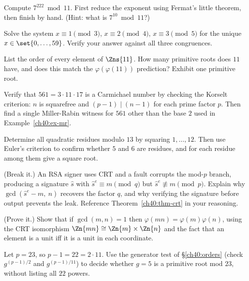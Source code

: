 \begin{exercise}
\label{ch40:ex-modexp2}
Compute $7^{222}\bmod 11$. First reduce the exponent using Fermat's little theorem, then finish by
hand. (Hint: what is $7^{10}\bmod 11$?)
\end{exercise}

\begin{exercise}
\label{ch40:ex-crt2}
Solve the system $x\equiv 1\pmod 3$, $x\equiv 2\pmod 4$, $x\equiv 3\pmod 5$ for the unique
$x\in\set{0,\dots,59}$. Verify your answer against all three congruences.
\end{exercise}

\begin{exercise}
\label{ch40:ex-order2}
List the order of every element of $\Zns{11}$. How many primitive roots does $11$ have, and does
this match the $\varphi(\varphi(11))$ prediction? Exhibit one primitive root.
\end{exercise}

\begin{exercise}
\label{ch40:ex-carmichael}
Verify that $561 = 3\cdot 11\cdot 17$ is a Carmichael number by checking the Korselt criterion: $n$
is squarefree and $(p-1)\mid(n-1)$ for each prime factor $p$. Then find a single Miller-Rabin witness
for $561$ other than the base $2$ used in Example~\ref{ch40:ex-mr}.
\end{exercise}

\begin{exercise}
\label{ch40:ex-qr}
Determine all quadratic residues modulo $13$ by squaring $1,\dots,12$. Then use Euler's criterion to
confirm whether $5$ and $6$ are residues, and for each residue among them give a square root.
\end{exercise}

\begin{exercise}
\label{ch40:ex-fault}
(Break it.) An RSA signer uses CRT and a fault corrupts the mod-$p$ branch, producing a signature
$\hat s$ with $\hat s^e\equiv m\pmod q$ but $\hat s^e\not\equiv m\pmod p$. Explain why
$\gcd(\hat s^e - m,\ n)$ recovers the factor $q$, and why verifying the signature before output
prevents the leak. Reference Theorem~\ref{ch40:thm-crt} in your reasoning.
\end{exercise}

\begin{exercise}
\label{ch40:ex-totient-prove}
(Prove it.) Show that if $\gcd(m,n)=1$ then $\varphi(mn)=\varphi(m)\varphi(n)$, using the CRT
isomorphism $\Zn{mn}\cong\Zn{m}\times\Zn{n}$ and the fact that an element is a unit iff it is a unit
in each coordinate.
\end{exercise}

\begin{exercise}
\label{ch40:ex-primroot-test}
Let $p = 23$, so $p-1 = 22 = 2\cdot 11$. Use the generator test of \S\ref{ch40:orders} (check
$g^{(p-1)/2}$ and $g^{(p-1)/11}$) to decide whether $g=5$ is a primitive root mod $23$, without
listing all $22$ powers.
\end{exercise}
